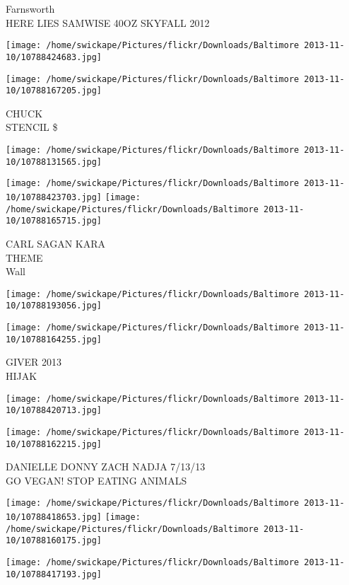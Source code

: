 \documentclass[10pt,letterpaper]{article}
\begin{document}
Farnsworth\\
HERE LIES SAMWISE 40OZ SKYFALL 2012
\pagebreak

\texttt{[image: /home/swickape/Pictures/flickr/Downloads/Baltimore 2013-11-10/10788424683.jpg]}

\vspace{0.25in}
\texttt{[image: /home/swickape/Pictures/flickr/Downloads/Baltimore 2013-11-10/10788167205.jpg]}

CHUCK\\
STENCIL \$
\pagebreak

\texttt{[image: /home/swickape/Pictures/flickr/Downloads/Baltimore 2013-11-10/10788131565.jpg]}

\vspace{0.25in}
\texttt{[image: /home/swickape/Pictures/flickr/Downloads/Baltimore 2013-11-10/10788423703.jpg]}
\texttt{[image: /home/swickape/Pictures/flickr/Downloads/Baltimore 2013-11-10/10788165715.jpg]}

CARL SAGAN KARA\\
THEME\\
Wall
\pagebreak

\texttt{[image: /home/swickape/Pictures/flickr/Downloads/Baltimore 2013-11-10/10788193056.jpg]}

\vspace{0.25in}
\texttt{[image: /home/swickape/Pictures/flickr/Downloads/Baltimore 2013-11-10/10788164255.jpg]}

GIVER 2013\\
HIJAK
\pagebreak

\texttt{[image: /home/swickape/Pictures/flickr/Downloads/Baltimore 2013-11-10/10788420713.jpg]}

\vspace{0.25in}
\texttt{[image: /home/swickape/Pictures/flickr/Downloads/Baltimore 2013-11-10/10788162215.jpg]}

DANIELLE DONNY ZACH NADJA 7/13/13\\
GO VEGAN! STOP EATING ANIMALS
\pagebreak

\texttt{[image: /home/swickape/Pictures/flickr/Downloads/Baltimore 2013-11-10/10788418653.jpg]}
\texttt{[image: /home/swickape/Pictures/flickr/Downloads/Baltimore 2013-11-10/10788160175.jpg]}

\vspace{0.25in}
\texttt{[image: /home/swickape/Pictures/flickr/Downloads/Baltimore 2013-11-10/10788417193.jpg]}
\end{document}
